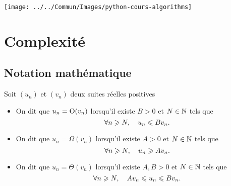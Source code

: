 \documentclass{magnolia}
\begin{document}
\hfill\texttt{[image: ../../Commun/Images/python-cours-algorithms]}
\magtoc

\section{Complexité}
\subsection{Notation mathématique}

\begin{definition}
Soit $(u_n)$ et $(v_n)$ deux suites réelles positives
\begin{itemize}
  \item On dit que $u_n={\rm O}(v_n)$ lorsqu'il existe $B>0$ et $N\in\mathbb{N}$ tels que
    \[\forall n\geqslant N,\quad u_n \leqslant B v_n.\]
  \item On dit que $u_n=\Omega(v_n)$ lorsqu'il existe $A>0$ et $N\in\mathbb{N}$ tels que
    \[\forall n\geqslant N,\quad u_n \geqslant A v_n.\]
  \item On dit que $u_n=\Theta(v_n)$ lorsqu'il existe $A,B>0$ et $N\in\mathbb{N}$ tels que
    \[\forall n\geqslant N,\quad A v_n \leqslant u_n \leqslant B v_n.\]
\end{itemize}
\end{definition}
\end{document}

